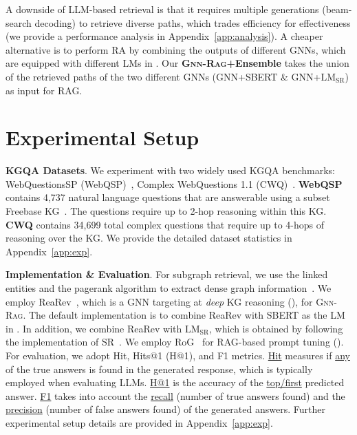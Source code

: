 \documentclass{article}
\newcommand{\grag}{\textsc{Gnn-Rag}\xspace}
\newcommand{\gragx}{\textsc{Gnn-Rag}}
\newcommand{\lmsr}{$\text{LM}_{\text{SR}}$\xspace}
\theoremstyle{plain}
\theoremstyle{definition}
\theoremstyle{remark}
\begin{document}
A downside of LLM-based retrieval is that it requires multiple generations (beam-search decoding) to retrieve diverse paths, which trades efficiency for effectiveness (we provide a performance analysis in Appendix~\ref{app:analysis}). A cheaper alternative is to perform RA by combining the outputs of different GNNs, which are equipped with different LMs in . Our \textbf{\gragx+Ensemble} takes the union of the retrieved paths of the two different GNNs (GNN+SBERT \& GNN+\lmsr) as input for RAG. 













\section{Experimental Setup}

\textbf{KGQA Datasets}.
We experiment with two widely used KGQA benchmarks: WebQuestionsSP (WebQSP)~\citep{yih2015semantic}, 
Complex WebQuestions 1.1 (CWQ)~\citep{talmor2018web}.
\textbf{WebQSP} contains 4,737 natural language questions that are answerable using a subset Freebase KG~\citep{bollacker2008freebase}. The questions require up to 2-hop reasoning within this KG. \textbf{CWQ} contains 34,699 total complex questions that require up to 4-hops of reasoning over the KG. We provide the detailed dataset statistics in Appendix~\ref{app:exp}.

\textbf{Implementation \& Evaluation}. 
For subgraph retrieval, we use the linked entities and the pagerank algorithm to extract dense graph information~\citep{he2021improving}. We employ ReaRev~\citep{mavromatis2022rearev}, which is a GNN targeting at \emph{deep} KG reasoning (), for \grag.  The default implementation is to combine ReaRev with SBERT as the LM in . In addition, we combine ReaRev with \lmsr, which is obtained by following the implementation of SR~\citep{zhang2022subgraph}.  We employ RoG~\citep{luo2024rog} for RAG-based prompt tuning ().
For evaluation, we adopt Hit, Hits@1 (H@1), and F1 metrics. \underline{Hit} measures if \underline{any} of the true answers is found in the generated response, which is typically employed when evaluating LLMs. \underline{H@1} is the accuracy of the \underline{top/first} predicted answer. \underline{F1} takes into account the \underline{recall} (number of true answers found) and the \underline{precision} (number of false answers found) of the generated answers. 
Further experimental setup details are provided in Appendix~\ref{app:exp}.
\end{document}
